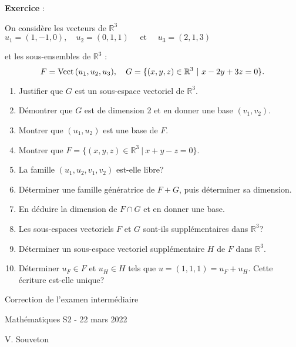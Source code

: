 \documentclass[12pt,a4paper]{article}
\newcommand{\R}{{\mathbb{R}}}
\newcounter{numexo}
\newenvironment{exo}[1][]%
{\stepcounter{numexo}%

\addvspace{\bigskipamount}%
\noindent\textbf{Exercice \thenumexo} : \textit{#1}\nopagebreak[4]%

\addvspace{\smallskipamount}\noindent }%
{%

\addvspace{\bigskipamount}%
}%
\newcounter{exo}
\def\Vect{{\rm Vect\,}}
\begin{document}
\begin{exo} 
On consid\`ere les vecteurs de $\R^3$ \quad
$u_1=(1,-1,0),\quad u_2=(0,1,1)\quad \text{ et }\quad u_3=(2,1,3)$

et les sous-ensembles de $\R^3$ : 
$$F=\Vect(u_1,u_2,u_3),\quad G=\{(x,y,z)\in\R^3\ | \   x-2y+3z=0\}.$$


\begin{enumerate}

\item Justifier que $G$ est un sous-espace vectoriel de $\R^3$. 

\item D\'emontrer que $G$ est de dimension 2  et en donner une base $(v_1,v_2)$. 

\item Montrer que $(u_1,u_2)$ est une base de $F$.

\item Montrer que
$F=\{(x,y,z)\in\R^3\ | \ x+y-z=0\}.$

\item La famille $(u_1,u_2,v_1,v_2)$ est-elle libre? 

\item D\'eterminer une famille g\'en\'eratrice de $F+G$, puis d\'eterminer sa dimension.

\item En d\'eduire la dimension de $F\cap G$ et en donner une base.

\item Les sous-espaces vectoriels $F$ et $G$ sont-ils suppl\'ementaires dans $\R^3$?

\item D\'eterminer un sous-espace vectoriel suppl\'ementaire $H$ de $F$ dans $\R^3$.

\item D\'eterminer $u_F\in F$ et $u_H\in H$ tels que $u=(1,1,1)=u_F+u_H$. Cette \'ecriture est-elle unique?


\end{enumerate}


\end{exo}





\newpage


\begin{center}
	\huge Correction de l'examen intermédiaire
	
	\large Mathématiques S2 - 22 mars 2022
	
	\large V. Souveton
\end{center}
\end{document}

